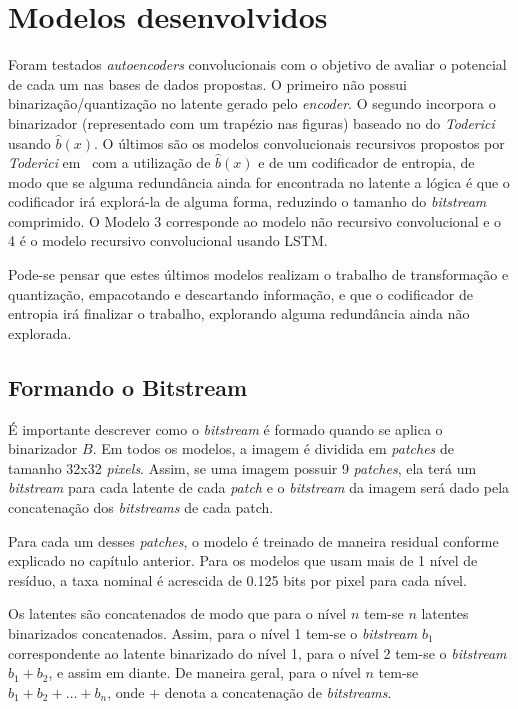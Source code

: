 \section{Modelos desenvolvidos}
Foram testados \textit{autoencoders} convolucionais com o objetivo de avaliar o potencial de cada um nas bases de dados propostas. O primeiro não possui binarização/quantização no latente gerado pelo \textit{encoder}. O segundo incorpora o binarizador (representado com um trapézio nas figuras) baseado no do \textit{Toderici} usando $\hat{b}(x)$. O últimos são os modelos convolucionais recursivos propostos por \textit{Toderici} em~\cite{Variable2016Toderici} com a utilização de $\hat{b}(x)$ e de um codificador de entropia, de modo que se alguma redundância ainda for encontrada no latente a lógica é que o codificador irá explorá-la de alguma forma, reduzindo o tamanho do \textit{bitstream} comprimido. O Modelo 3 corresponde ao modelo não recursivo convolucional e o 4 é o modelo recursivo convolucional usando LSTM.

Pode-se pensar que estes últimos modelos realizam o trabalho de transformação e quantização, empacotando e descartando informação, e que o codificador de entropia irá finalizar o trabalho, explorando alguma redundância ainda não explorada.

\subsection{Formando o Bitstream}
É importante descrever como o \textit{bitstream} é formado quando se aplica o binarizador $B$. Em todos os modelos, a imagem é dividida em \textit{patches} de tamanho 32x32 \textit{pixels}. Assim, se uma imagem possuir 9 \textit{patches}, ela terá um \textit{bitstream} para cada latente de cada \textit{patch} e o \textit{bitstream} da imagem será dado pela concatenação dos \textit{bitstreams} de cada patch. 

Para cada um desses \textit{patches}, o modelo é treinado de maneira residual conforme explicado no capítulo anterior. Para os modelos que usam mais de 1 nível de resíduo, a taxa nominal é acrescida de 0.125 bits por pixel para cada nível. 

Os latentes são concatenados de modo que para o nível $n$ tem-se $n$ latentes binarizados concatenados. Assim, para o nível 1 tem-se o \textit{bitstream} $b_1$ correspondente ao latente binarizado do nível 1, para o nível 2 tem-se o \textit{bitstream} $b_1 + b_2$, e assim em diante. De maneira geral, para o nível $n$ tem-se $b_1 + b_2 + \dots + b_n$, onde $+$ denota a concatenação de \textit{bitstreams}. 

